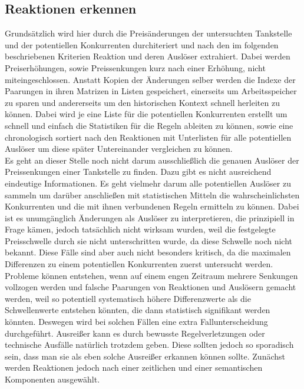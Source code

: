 \documentclass[12pt,a4paper,bibliography=totocnumbered,listof=totocnumbered]{scrartcl}
\begin{document}
\subsection{Reaktionen erkennen}
Grundsätzlich wird hier durch die Preisänderungen der untersuchten Tankstelle und der potentiellen Konkurrenten durchiteriert und nach den im folgenden beschriebenen Kriterien Reaktion und deren Auslöser extrahiert. Dabei werden Preiserhöhungen, sowie Preissenkungen kurz nach einer Erhöhung, nicht miteingeschlossen. Anstatt Kopien der Änderungen selber werden die Indexe der Paarungen in ihren Matrizen in Listen gespeichert, einerseits um Arbeitsspeicher zu sparen und andererseits um den historischen Kontext schnell herleiten zu können. Dabei wird je eine Liste für die potentiellen Konkurrenten erstellt um schnell und einfach die Statistiken für die Regeln ableiten zu können, sowie eine chronologisch sortiert nach den Reaktionen mit Unterlisten für alle potentiellen Auslöser um diese später Untereinander vergleichen zu können.\\
Es geht an dieser Stelle noch nicht darum ausschließlich die genauen Auslöser der Preissenkungen einer Tankstelle zu finden. Dazu gibt es nicht ausreichend eindeutige Informationen. Es geht vielmehr darum alle potentiellen Auslöser zu sammeln um darüber anschließen mit statistischen Mitteln die wahrscheinlichsten Konkurrenten und die mit ihnen verbundenen Regeln ermitteln zu können. Dabei ist es unumgänglich  Änderungen als Auslöser zu interpretieren, die prinzipiell in Frage kämen, jedoch tatsächlich nicht wirksam wurden, weil die festgelegte Preisschwelle durch sie nicht unterschritten wurde, da diese Schwelle noch nicht bekannt. Diese Fälle sind aber auch nicht besonders kritisch, da die maximalen Differenzen zu einem potentiellen Konkurrenten zuerst untersucht werden.\\
Probleme können entstehen, wenn auf einem engen Zeitraum mehrere Senkungen vollzogen werden und falsche Paarungen von Reaktionen und Auslösern gemacht werden, weil so potentiell systematisch höhere Differenzwerte als die Schwellenwerte entstehen könnten, die dann statistisch signifikant werden könnten. Deswegen wird bei solchen Fällen eine extra Fallunterscheidung durchgeführt. Ausreißer kann es durch bewusste Regelverletzungen oder technische Ausfälle natürlich trotzdem geben. Diese sollten jedoch so sporadisch sein, dass man sie als eben solche Ausreißer erkannen können sollte. Zunächst werden Reaktionen jedoch nach einer zeitlichen und einer semantischen Komponenten ausgewählt.
\end{document}
